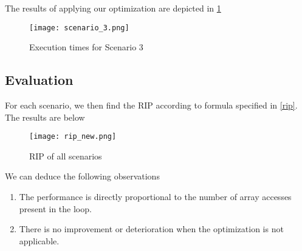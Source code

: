 The results of applying our optimization are depicted in \ref{TC_3}

\begin{figure}[H]
	\centering
	\texttt{[image: scenario\_3.png]}
	\caption{Execution times for Scenario 3}
	\label{TC_3}	
\end{figure}


\subsection{Evaluation}

For each scenario, we then find the RIP according to formula specified in \ref{rip}. The results are below 

\begin{figure}[H]
	\centering
	\texttt{[image: rip\_new.png]}
	\caption{RIP of all scenarios}
	\label{RIP}	
\end{figure}

\pagebreak

We can deduce the following observations

\begin{enumerate}
	\item The performance is directly proportional to the number of array accesses present in the loop.
	\item There is no improvement or deterioration when the optimization is not applicable. 
\end{enumerate}
